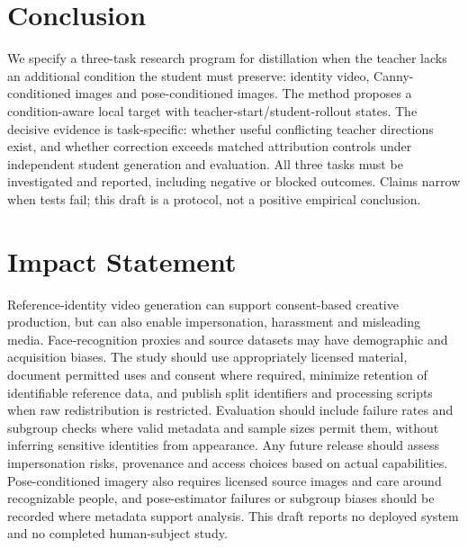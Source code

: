 \documentclass{article}
\begin{document}
\section{Conclusion}
We specify a three-task research program for distillation when the teacher lacks an additional condition the student must preserve: identity video, Canny-conditioned images and pose-conditioned images. The method proposes a condition-aware local target with teacher-start/student-rollout states. The decisive evidence is task-specific: whether useful conflicting teacher directions exist, and whether correction exceeds matched attribution controls under independent student generation and evaluation. All three tasks must be investigated and reported, including negative or blocked outcomes. Claims narrow when tests fail; this draft is a protocol, not a positive empirical conclusion.

\section*{Impact Statement}
Reference-identity video generation can support consent-based creative production, but can also enable impersonation, harassment and misleading media. Face-recognition proxies and source datasets may have demographic and acquisition biases. The study should use appropriately licensed material, document permitted uses and consent where required, minimize retention of identifiable reference data, and publish split identifiers and processing scripts when raw redistribution is restricted. Evaluation should include failure rates and subgroup checks where valid metadata and sample sizes permit them, without inferring sensitive identities from appearance. Any future release should assess impersonation risks, provenance and access choices based on actual capabilities. Pose-conditioned imagery also requires licensed source images and care around recognizable people, and pose-estimator failures or subgroup biases should be recorded where metadata support analysis. This draft reports no deployed system and no completed human-subject study.
\end{document}
